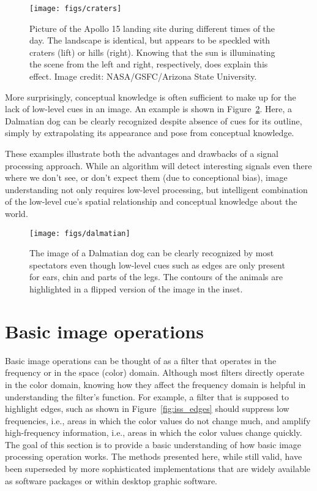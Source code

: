 \begin{figure}[!htb]
    \centering
    \texttt{[image: figs/craters]}
    \caption{Picture of the Apollo 15 landing site during different times of the day. The landscape is identical, but appears to be speckled with craters (lift) or hills (right). Knowing that the sun is illuminating the scene from the left and right, respectively, does explain this effect. Image credit: NASA/GSFC/Arizona State University.
    \label{fig:craters}}
\end{figure}

More surprisingly, conceptual knowledge is often sufficient to make up for the lack of low-level cues in an image. An example is shown in Figure~\ref{fig:dalmatian}. Here, a Dalmatian dog can be clearly recognized despite absence of cues for its outline, simply by extrapolating its appearance and pose from conceptual knowledge.

These examples illustrate both the advantages and drawbacks of a signal processing approach. While an algorithm will detect interesting signals even there where we don't see, or don't expect them (due to conceptional bias), image understanding not only requires low-level processing, but intelligent combination of the low-level cue's spatial relationship and conceptual knowledge about the world.


\begin{figure}
    \centering
    \texttt{[image: figs/dalmatian]}
    \caption{The image of a Dalmatian dog can be clearly recognized by most spectators even though low-level cues such as edges are only present for ears, chin and parts of the legs. The contours of the animals are highlighted in a flipped version of the image in the inset.
    \label{fig:dalmatian}}
\end{figure}

\section{Basic image operations}
Basic image operations can be thought of as a filter that operates in the frequency or in the space (color) domain. Although most filters directly operate in the color domain, knowing how they affect the frequency domain is helpful in understanding the filter's function. For example, a filter that is supposed to highlight edges, such as shown in Figure~\ref{fig:iss_edges} should suppress low frequencies, i.e., areas in which the color values do not change much, and amplify high-frequency information, i.e., areas in which the color values change quickly. The goal of this section is to provide a basic understanding of how basic image processing operation works. The methods presented here, while still valid, have been superseded by more sophisticated implementations that are widely available as software packages or within desktop graphic software.

